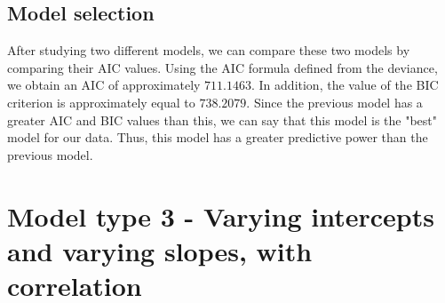 \documentclass{article}
\begin{document}
\subsection{Model selection}
After studying two different models, we can compare these two models by comparing their AIC values.
Using the AIC formula defined from the deviance, we obtain an AIC of approximately $711.1463$. In addition, the value of the BIC criterion is approximately equal to $738.2079$.
Since the previous model has a greater AIC and BIC values than this, we can say that this model is the "best" model for our data. Thus, this model has a greater predictive power than the previous model.



\section{Model type 3 - Varying intercepts and varying slopes, with correlation}
\end{document}
